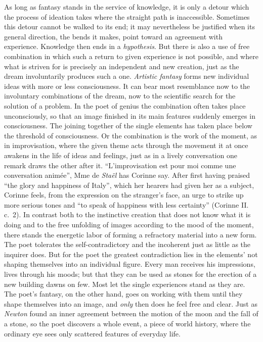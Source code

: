 \documentclass[12pt,a4paper]{book}
\newcommand{\opage}[1]{\marginnote{\footnotesize\textit{[#1]}}}
\begin{document}
As long as fantasy stands in the service of knowledge, it is only a
detour which the process of ideation takes where the straight path is
inaccessible. Sometimes this detour cannot be walked to its end; it may
nevertheless be justified when its general direction, the bends it
makes, point toward an agreement with experience. Knowledge then ends in
a \emph{hypothesis}. But there is also a use of free combination in
which such a return to given experience is not possible, and where what
is striven for is precisely an independent and new creation, just as
the dream involuntarily produces such a one. \emph{Artistic fantasy}
forms new individual ideas with more or less consciousness. It can bear
most resemblance now to the involuntary combinations of the dream, now
to the scientific search for the solution of a problem. In the poet of
genius the combination often takes place unconsciously, so that an
image finished in its main features suddenly emerges in consciousness.
The joining together of the single elements has taken place below the
threshold of consciousness. Or the combination is the work of the
moment, as in improvisation, where the given theme acts through the
movement it at once awakens in the life of ideas and feelings, just as
in a lively conversation one remark draws the other after it.
``L'improvisation est pour moi comme une conversation animée'', Mme de
\emph{Staël} has Corinne say. After first having praised ``the glory and
happiness of Italy'', which her hearers had given her as a subject,
Corinne feels, from the expression on the stranger's face, an urge to
strike up more serious tones and ``to speak of happiness with less
certainty'' (Corinne II. c.~2). In contrast both to the instinctive
creation that does not know
\opage{224}what it is doing and to the free unfolding of images
according to the mood of the moment, there stands the energetic labor of
forming a refractory material into a new form. The poet tolerates the
self-contradictory and the incoherent just as little as the inquirer
does. But for the poet the greatest contradiction lies in the elements'
not shaping themselves into an individual figure. Every man receives his
impressions, lives through his moods; but that they can be used as
stones for the erection of a new building dawns on few. Most let the
single experiences stand as they are. The poet's fantasy, on the other
hand, goes on working with them until they shape themselves into an
image, and \emph{only} then does he feel free and clear. Just as
\emph{Newton} found an inner agreement between the motion of the moon
and the fall of a stone, so the poet discovers a whole event, a piece of
world history, where the ordinary eye sees only scattered features of
everyday life.
\end{document}
